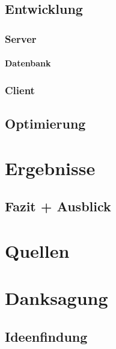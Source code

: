 \documentclass[a4paper,12pt,ngerman]{scrreport}
\begin{document}
    \section{Entwicklung}
    \subsection{Server}
    \subsubsection{Datenbank}
    \subsection{Client}
    \section{Optimierung}


    \chapter{Ergebnisse}

    \section{Fazit + Ausblick}

    \chapter{Quellen}
    \chapter{Danksagung}

    \section{Ideenfindung}
\end{document}
